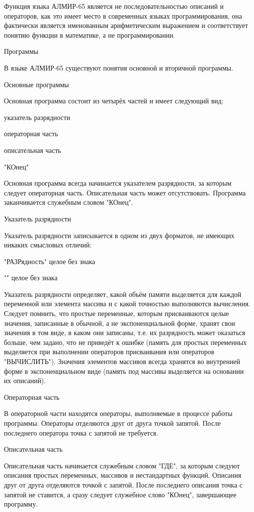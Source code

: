 \documentclass[11pt]{article}
\begin{document}
Функция языка АЛМИР-65 является не
последовательностью описаний и
операторов, как это имеет место в
современных языках программирования,
она фактически является именованным
арифметическим выражением и
соответствует понятию функции в
математике, а не программировании.

Программы

В языке АЛМИР-65 существуют понятия
основной и вторичной программы.

Основные программы

Основная программа состоит из четырёх
частей и имеет следующий вид:

указатель разрядности

операторная часть

описательная часть

"КОнец"

Основная программа всегда начинается
указателем разрядности, за которым
следует операторная часть.
Описательная часть может
отсутствовать. Программа
заканчивается служебным словом "КОнец".

Указатель разрядности

Указатель разрядности записывается в
одном из двух форматов, не имеющих
никаких смысловых отличий:

"РАЗРядность" целое без знака

"" целое без знака

Указатель разрядности определяет,
какой объём памяти выделяется для
каждой переменной или элемента массива
и с какой точностью выполняются
вычисления. Следует помнить, что
простые переменные, которым
присваиваются целые значения,
записанные в обычной, а не
экспоненциальной форме, хранят свои
значения в том виде, в каком они
записаны, т.е. их разрядность может
оказаться больше, чем задано, что не
приведёт к ошибке (память для простых
переменных выделяется при выполнении
операторов присваивания или
операторов "ВЫЧИСЛИТЬ"). Значения
элементов массивов всегда хранятся во
внутренней форме в экспоненциальном
виде (память под массивы выделяется на
основании их описаний).

Операторная часть

В операторной части находятся
операторы, выполняемые в процессе
работы программы. Операторы отделяются
друг от друга точкой запятой. После
последнего оператора точка с запятой
не требуется.

Описательная часть

Описательная часть начинается
служебным словом "ГДЕ", за которым
следуют описания простых переменных,
массивов и нестандартных функций.
Описания друг от друга отделяются
точкой с запятой. После последнего
описания точка с запятой не ставится, а
сразу следует служебное слово "КОнец",
завершающее программу.
\end{document}
